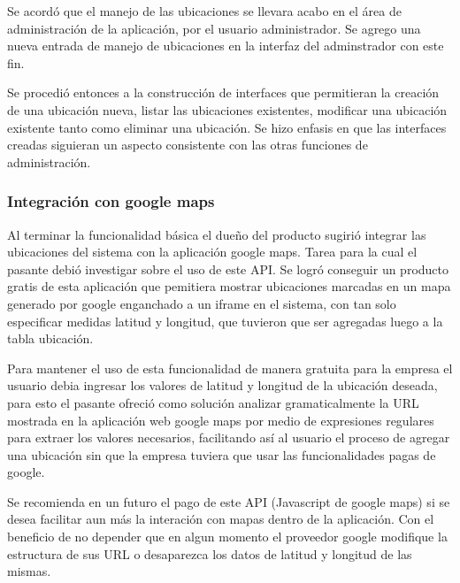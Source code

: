 Se acordó que el manejo de las ubicaciones se llevara acabo en el área de administración de la aplicación, por el usuario administrador. Se agrego una nueva entrada de manejo de ubicaciones en la interfaz del adminstrador con este fin.

Se procedió entonces a la construcción de interfaces que permitieran la creación de una ubicación nueva, listar las ubicaciones existentes, modificar una ubicación existente tanto como eliminar una ubicación. Se hizo enfasis en que las interfaces creadas siguieran un aspecto consistente con las otras funciones de administración.

\subsubsection{Integración con google maps}

Al terminar la funcionalidad básica el dueño del producto sugirió integrar las ubicaciones del sistema con la aplicación google maps. Tarea para la cual el pasante debió investigar sobre el uso de este API. Se logró conseguir un producto gratis de esta aplicación que pemitiera mostrar ubicaciones marcadas en un mapa generado por google enganchado a un iframe en el sistema, con tan solo especificar medidas latitud y longitud, que tuvieron que ser agregadas luego a la tabla ubicación.

Para mantener el uso de esta funcionalidad de manera gratuita para la empresa el usuario debia ingresar los valores de latitud y longitud de la ubicación deseada, para esto el pasante ofreció como solución analizar gramaticalmente la URL mostrada en la aplicación web google maps por medio de expresiones regulares para extraer los valores necesarios, facilitando así al usuario el proceso de agregar una ubicación sin que la empresa tuviera que usar las funcionalidades pagas de google.

Se recomienda en un futuro el pago de este API (Javascript de google maps) si se desea facilitar aun más la interación con mapas dentro de la aplicación. Con el beneficio de no depender que en algun momento el proveedor google modifique la estructura de sus URL o desaparezca los datos de latitud y longitud de las mismas.






